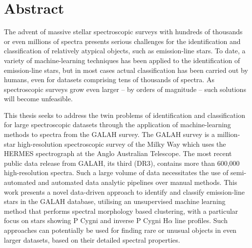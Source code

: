 \chapter{Abstract}

The advent of massive stellar spectroscopic surveys with hundreds of thousands or even millions of spectra presents serious challenges for the identification and classification of relatively atypical objects, such as emission-line stars. To date, a variety of machine-learning techniques has been applied to the identification of emission-line stars, but in most cases actual classification has been carried out by humans, even for datasets comprising tens of thousands of spectra. As spectroscopic surveys grow even larger – by orders of magnitude – such solutions will become unfeasible.

This thesis seeks to address the twin problems of identification and classification for large spectroscopic datasets through the application of machine-learning methods to spectra from the GALAH survey. The GALAH survey is a million-star high-resolution spectroscopic survey of the Milky Way which uses the HERMES spectrograph at the Anglo Australian Telescope. The most recent public data release from GALAH, its third (DR3), contains more than 600,000 high-resolution spectra. Such a large volume of data necessitates the use of semi-automated and automated data analytic pipelines over manual methods. This work presents a novel data-driven approach to identify and classify emission-line stars in the GALAH database, utilising an unsupervised machine learning method that performs spectral morphology based clustering, with a particular focus on stars showing P Cygni and inverse P Cygni H$\alpha$ line profiles. Such approaches can potentially be used for finding rare or unusual objects in even larger datasets, based on their detailed spectral properties.

